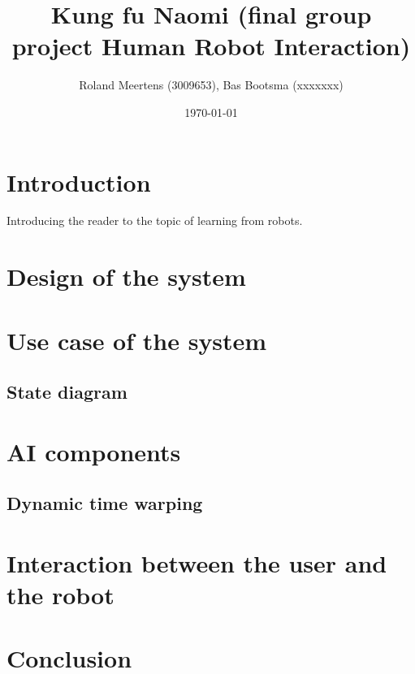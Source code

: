 \documentclass[a4paper,10pt]{article}
\begin{document}
\title{Kung fu Naomi (final group project Human Robot Interaction)}

\author{Roland Meertens (3009653), Bas Bootsma (xxxxxxx)}

\date{\today}

\maketitle



\section{Introduction}
Introducing the reader to the topic of learning from robots. 

\section{Design of the system}

\section{Use case of the system}

\subsection{State diagram}
\section{AI components}

\subsection{Dynamic time warping}

\section{Interaction between the user and the robot}

\section{Conclusion}



\end{document}
